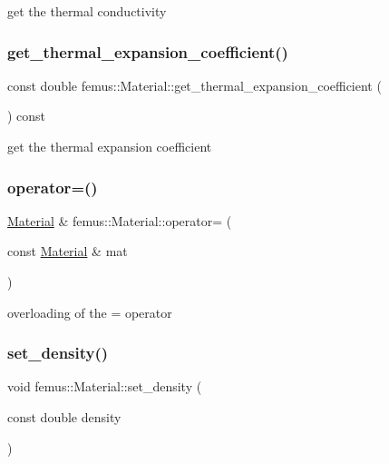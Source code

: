 get the thermal conductivity \mbox{\label{classfemus_1_1_material_a7bd333c73a04e3e85e733a1329facda3}} 
\subsubsection{\texorpdfstring{get\+\_\+thermal\+\_\+expansion\+\_\+coefficient()}{get\_thermal\_expansion\_coefficient()}}
{\footnotesize\ttfamily const double femus\+::\+Material\+::get\+\_\+thermal\+\_\+expansion\+\_\+coefficient (\begin{DoxyParamCaption}{ }\end{DoxyParamCaption}) const}

get the thermal expansion coefficient \mbox{\label{classfemus_1_1_material_aa0f3066f8944ccbbd003fc633de9280b}} 
\subsubsection{\texorpdfstring{operator=()}{operator=()}}
{\footnotesize\ttfamily \mbox{\hyperlink{classfemus_1_1_material}{Material}} \& femus\+::\+Material\+::operator= (\begin{DoxyParamCaption}\item[{const \mbox{\hyperlink{classfemus_1_1_material}{Material}} \&}]{mat }\end{DoxyParamCaption})}

overloading of the = operator \mbox{\label{classfemus_1_1_material_a69346301301244f041f7294c293c95a5}} 
\subsubsection{\texorpdfstring{set\+\_\+density()}{set\_density()}}
{\footnotesize\ttfamily void femus\+::\+Material\+::set\+\_\+density (\begin{DoxyParamCaption}\item[{const double}]{density }\end{DoxyParamCaption})}

